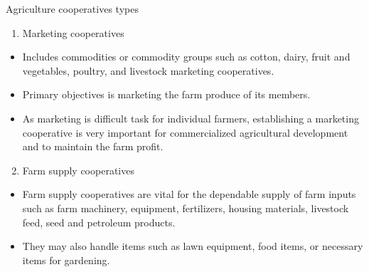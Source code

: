 \documentclass[12pt,ignorenonframetext,aspectratio=169]{beamer}
\providecommand{\tightlist}{%
  \setlength{\itemsep}{0pt}\setlength{\parskip}{0pt}}
\begin{document}
\begin{frame}{Agriculture cooperatives types}
\protect\hypertarget{agriculture-cooperatives-types}{}
\footnotesize

\begin{enumerate}
\tightlist
\item
  Marketing cooperatives
\end{enumerate}

\begin{itemize}
\tightlist
\item
  Includes commodities or commodity groups such as cotton, dairy, fruit
  and vegetables, poultry, and livestock marketing cooperatives.
\item
  Primary objectives is marketing the farm produce of its members.
\item
  As marketing is difficult task for individual farmers, establishing a
  marketing cooperative is very important for commercialized
  agricultural development and to maintain the farm profit.
\end{itemize}

\begin{enumerate}
\setcounter{enumi}{1}
\tightlist
\item
  Farm supply cooperatives
\end{enumerate}

\begin{itemize}
\tightlist
\item
  Farm supply cooperatives are vital for the dependable supply of farm
  inputs such as farm machinery, equipment, fertilizers, housing
  materials, livestock feed, seed and petroleum products.
\item
  They may also handle items such as lawn equipment, food items, or
  necessary items for gardening.
\end{itemize}
\end{frame}
\end{document}

